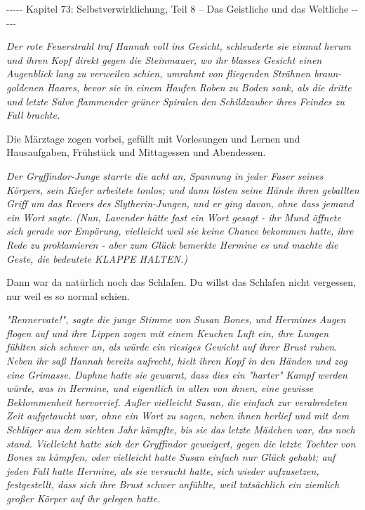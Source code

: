 

\hypertarget{selbstverwirklichung-teil-8-das-geistliche-und-das-weltliche}{%

-\/-\/-\/-\/- Kapitel 73: Selbstverwirklichung, Teil 8 -- Das Geistliche und das Weltliche -\/-\/-\/-\/-

\emph{\emph{Der rote Feuerstrahl traf Hannah voll ins Gesicht, schleuderte sie einmal herum und ihren Kopf direkt gegen die Steinmauer, wo ihr blasses Gesicht einen Augenblick lang zu verweilen schien, umrahmt von fliegenden Strähnen braun-goldenen Haares, bevor sie in einem Haufen Roben zu Boden sank, als die dritte und letzte Salve flammender grüner Spiralen den Schildzauber ihres Feindes zu Fall brachte.}}

Die Märztage zogen vorbei, gefüllt mit Vorlesungen und Lernen und Hausaufgaben, Frühstück und Mittagessen und Abendessen.

\emph{\emph{Der Gryffindor-Junge starrte die acht an, Spannung in jeder Faser seines Körpers, sein Kiefer arbeitete tonlos; und dann lösten seine Hände ihren geballten Griff um das Revers des Slytherin-Jungen, und er ging davon, ohne dass jemand ein Wort sagte. (Nun, Lavender hätte fast ein Wort gesagt - ihr Mund öffnete sich gerade vor Empörung, vielleicht weil sie keine Chance bekommen hatte, ihre Rede zu proklamieren - aber zum Glück bemerkte Hermine es und machte die Geste, die bedeutete KLAPPE HALTEN.)}}

Dann war da natürlich noch das Schlafen. Du willst das Schlafen nicht vergessen, nur weil es so normal schien.

\emph{\emph{"Rennervate!", sagte die junge Stimme von Susan Bones, und Hermines Augen flogen auf und ihre Lippen zogen mit einem Keuchen Luft ein, ihre Lungen fühlten sich schwer an, als würde ein riesiges Gewicht auf ihrer Brust ruhen. Neben ihr saß Hannah bereits aufrecht, hielt ihren Kopf in den Händen und zog eine Grimasse. Daphne hatte sie gewarnt, dass dies ein "harter" Kampf werden würde, was in Hermine, und eigentlich in allen von ihnen, eine gewisse Beklommenheit hervorrief. Außer vielleicht Susan, die einfach zur verabredeten Zeit aufgetaucht war, ohne ein Wort zu sagen, neben ihnen herlief und mit dem Schläger aus dem siebten Jahr kämpfte, bis sie das letzte Mädchen war, das noch stand. Vielleicht hatte sich der Gryffindor geweigert, gegen die letzte Tochter von Bones zu kämpfen, oder vielleicht hatte Susan einfach nur Glück gehabt; auf jeden Fall hatte Hermine, als sie versucht hatte, sich wieder aufzusetzen, festgestellt, dass sich ihre Brust schwer anfühlte, weil tatsächlich ein ziemlich großer Körper auf ihr gelegen hatte.}}

}
